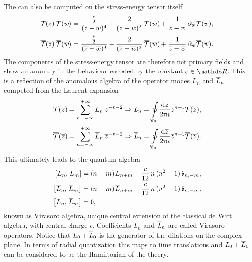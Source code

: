 The \ope can also be computed on the stress-energy tensor itself:
\begin{equation}
  \begin{split}
    \mathcal{T}( z )\, \mathcal{T}( w )
    & =
    \frac{\frac{c}{2}}{(z - w)^4}
    +
    \frac{2}{(z - w)^2}\, \mathcal{T}(w)
    +
    \frac{1}{z - w}\, \partial_{w} \mathcal{T}(w),
    \\
    \overline{\mathcal{T}}( \overline{z} )\, \overline{\mathcal{T}}( \overline{w} )
    & =
    \frac{\frac{\overline{c}}{2}}{(\overline{z} - \overline{w})^4}
    +
    \frac{2}{(\overline{z} - \overline{w})^2}\, \overline{\mathcal{T}}(\overline{w})
    +
    \frac{1}{\overline{z} - \overline{w}}\, \partial_{\overline{w}} \overline{\mathcal{T}}(\overline{w}).
  \end{split}
  \label{eq:conf:TTexpansion}
\end{equation}
The components of the stress-energy tensor are therefore not primary fields and show an anomaly in the behaviour encoded by the constant $c \in \R$.
This is a reflection of the anomalous algebra of the operator modes $L_n$ and $\overline{L}_n$ computed from the Laurent expansion
\begin{equation}
  \begin{split}
    \mathcal{T}( z ) = \sum\limits_{n = -\infty}^{+\infty} L_n\, z^{-n -2}
    & \Rightarrow
    L_n = \oint\limits_{\mathscr{C}_{0}} \frac{\mathrm{d}z}{2 \uppi i} z^{n + 1} \mathcal{T}(z),
    \\
    \overline{\mathcal{T}}( \overline{z} ) = \sum\limits_{n = -\infty}^{+\infty} \overline{L}_n\, \overline{z}^{-n -2}
    & \Rightarrow
    \overline{L}_n = \oint\limits_{\mathscr{C}_{0}} \frac{\mathrm{d}\overline{z}}{2 \uppi i} \overline{z}^{n + 1} \overline{\mathcal{T}}(\overline{z}).
  \end{split}
  \label{eq:conf:Texpansion}
\end{equation}
This ultimately leads to the quantum algebra
\begin{equation}
  \begin{split}
    \left[ L_n,\, L_m \right]
    & =
    (n - m)\, L_{n + m} + \frac{c}{12}\, n\, (n^2 - 1)\, \updelta_{n, -m},
    \\
    \left[ \overline{L}_n,\, \overline{L}_m \right]
    & =
    (n - m)\, \overline{L}_{n + m} + \frac{c}{12}\, n\, (n^2 - 1)\, \updelta_{n, -m},
    \\
    \left[ L_n,\, \overline{L}_m \right]
    & =
    0,
  \end{split}
  \label{eq:conf:virasoro}
\end{equation}
known as Virasoro algebra, unique central extension of the classical de Witt algebra, with central charge $c$.
Coefficients $L_n$ and $\overline{L}_n$ are called Virasoro operators.\footnotemark{}
Notice that $L_0 + \overline{L}_0$ is the generator of the dilations on the complex plane.
In terms of radial quantization this maps to time translations and $L_0 + \overline{L}_0$ can be considered to be the Hamiltonian of the theory.

